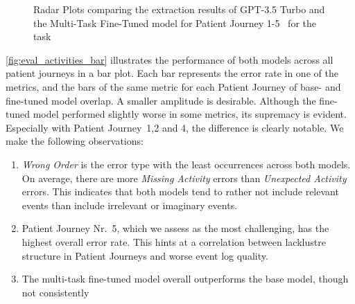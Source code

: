 \begin{figure}
  \caption{Radar Plots comparing the extraction results of GPT-3.5 Turbo and the Multi-Task Fine-Tuned model for Patient Journey 1-5~ for the task }
  \label{fig:eval_activities_rad}
\end{figure}
\autoref{fig:eval_activities_bar} illustrates the performance of both models across all patient journeys in a bar plot. Each bar represents the error rate in one of the metrics, and the bars of the same metric for each Patient Journey of base- and fine-tuned model overlap. A smaller amplitude is desirable. Although the fine-tuned model performed slightly worse in some metrics, its supremacy is evident. Especially with Patient Journey~1,2 and 4, the difference is clearly notable. We make the following observations:
\begin{enumerate}
    \item \emph{Wrong Order} is the error type with the least occurrences across both models. On average, there are more \emph{Missing Activity} errors than \emph{Unexpected Activity} errors. This indicates that both models tend to rather not include relevant events than include irrelevant or imaginary events.
    \item Patient Journey Nr.~5, which we assess as the most challenging, has the highest overall error rate. This hints at a correlation between lacklustre structure in Patient Journeys and worse event log quality.
    \item The multi-task fine-tuned model overall outperforms the base model, though not consistently
\end{enumerate}

